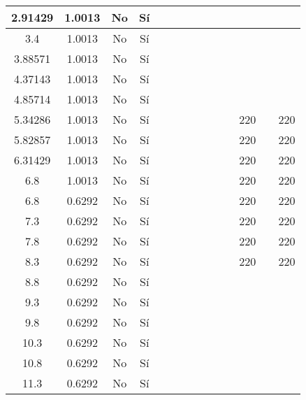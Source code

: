 \begin{table}[H]
{\begin{tabular}{|c|c|c|c|c|c|c|c|c|c|c|c|c|c|}
\hline
2.91429 & 1.0013 & No  & Sí  &     &     &     &     &     &     &     &     &     &  \bigstrut\\
\hline
3.4 & 1.0013 & No  & Sí  &     &     &     &     &     &     &     &     &     &  \bigstrut\\
\hline
3.88571 & 1.0013 & No  & Sí  &     &     &     &     &     &     &     &     &     &  \bigstrut\\
\hline
4.37143 & 1.0013 & No  & Sí  &     &     &     &     &     &     &     &     &     &  \bigstrut\\
\hline
4.85714 & 1.0013 & No  & Sí  &     &     &     &     &     &     &     &     &     &  \bigstrut\\
\hline
5.34286 & 1.0013 & No  & Sí  &     &     &     &     &     &     &     & 220 &     & 220 \bigstrut\\
\hline
5.82857 & 1.0013 & No  & Sí  &     &     &     &     &     &     &     & 220 &     & 220 \bigstrut\\
\hline
6.31429 & 1.0013 & No  & Sí  &     &     &     &     &     &     &     & 220 &     & 220 \bigstrut\\
\hline
6.8 & 1.0013 & No  & Sí  &     &     &     &     &     &     &     & 220 &     & 220 \bigstrut\\
\hline
6.8 & 0.6292 & No  & Sí  &     &     &     &     &     &     &     & 220 &     & 220 \bigstrut\\
\hline
7.3 & 0.6292 & No  & Sí  &     &     &     &     &     &     &     & 220 &     & 220 \bigstrut\\
\hline
7.8 & 0.6292 & No  & Sí  &     &     &     &     &     &     &     & 220 &     & 220 \bigstrut\\
\hline
8.3 & 0.6292 & No  & Sí  &     &     &     &     &     &     &     & 220 &     & 220 \bigstrut\\
\hline
8.8 & 0.6292 & No  & Sí  &     &     &     &     &     &     &     &     &     &  \bigstrut\\
\hline
9.3 & 0.6292 & No  & Sí  &     &     &     &     &     &     &     &     &     &  \bigstrut\\
\hline
9.8 & 0.6292 & No  & Sí  &     &     &     &     &     &     &     &     &     &  \bigstrut\\
\hline
10.3 & 0.6292 & No  & Sí  &     &     &     &     &     &     &     &     &     &  \bigstrut\\
\hline
10.8 & 0.6292 & No  & Sí  &     &     &     &     &     &     &     &     &     &  \bigstrut\\
\hline
11.3 & 0.6292 & No  & Sí  &     &     &     &     &     &     &     &     &     &  \bigstrut\\

\end{tabular}}
\end{table}
